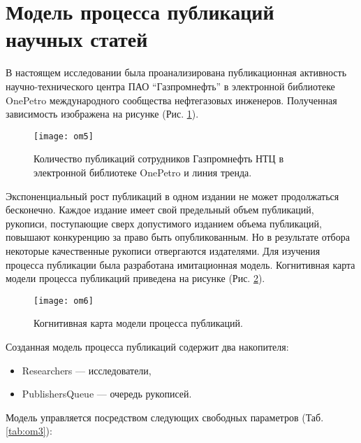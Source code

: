 \section{Модель процесса публикаций научных статей}
\label{sec:di}
В настоящем исследовании была проанализирована публикационная активность научно-технического центра ПАО ``Газпромнефть'' в электронной библиотеке OnePetro международного сообщества нефтегазовых инженеров. 
Полученная зависимость изображена на рисунке (Рис. \ref{fig:om5}).

\begin{figure}[H]
  \caption{Количество публикаций сотрудников Газпромнефть НТЦ в электронной библиотеке OnePetro и линия тренда.}
  \centering
    \texttt{[image: om5]}
  \label{fig:om5}
\end{figure}  

Экспоненциальный рост публикаций в одном издании не может продолжаться бесконечно. 
Каждое издание имеет свой предельный объем публикаций, рукописи, поступающие сверх допустимого изданием объема публикаций, повышают конкуренцию за право быть опубликованным. 
Но в результате отбора некоторые качественные рукописи отвергаются издателями.
Для изучения процесса публикации была разработана имитационная модель. 
Когнитивная карта модели процесса публикаций приведена на рисунке (Рис. \ref{fig:om6}).

\begin{figure}[H]
  \caption{Когнитивная карта модели процесса публикаций.}
  \centering
    \texttt{[image: om6]}
  \label{fig:om6}
\end{figure} 

Созданная модель процесса публикаций содержит два накопителя:
\begin{itemize}
\tightlist
\item Researchers — исследователи,
\item PublishersQueue — очередь рукописей.
\end{itemize}

Модель управляется посредством следующих свободных параметров (Таб. \ref{tab:om3}): 

\begin{table}[H]
\centering
\caption{Свободные параметры модели процесса публикаций.}
\label{tab:om3}
\end{table}

